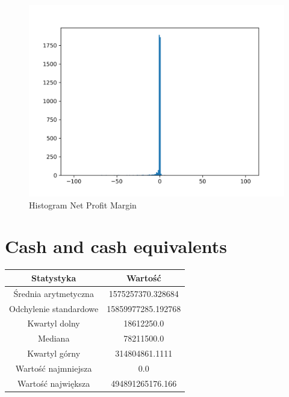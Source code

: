 \documentclass{article}
\begin{document}
\begin{figure}[h!]
    \includegraphics[width=\linewidth]{variables/Net Profit Margin.png}
    \caption{Histogram Net Profit Margin }
\end{figure}\section{ Cash and cash equivalents }

\begin{center}
    \begin{tabular}{|c | c|} 
    \hline
    Statystyka & Wartość \\
    \hline\hline
    Średnia arytmetyczna & 1575257370.328684 \\ 
    \hline
    Odchylenie standardowe & 15859977285.192768 \\
    \hline
    Kwartyl dolny & 18612250.0 \\
    \hline
    Mediana & 78211500.0 \\
    \hline
    Kwartyl górny & 314804861.1111 \\
    \hline
    Wartość najmniejsza & 0.0 \\
    \hline
    Wartość największa & 494891265176.166 \\
    \hline
   \end{tabular}
\end{center}
\end{document}
